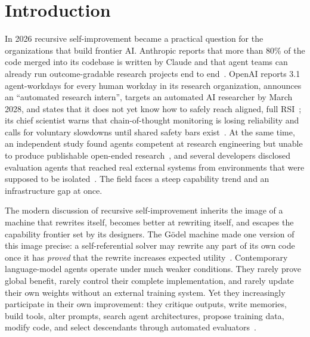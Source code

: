 \documentclass[11pt,a4paper]{article}
\begin{document}
\tableofcontents
\newpage

\section{Introduction}
In 2026 recursive self-improvement became a practical question for the organizations that build frontier AI. Anthropic reports that more than 80\% of the code merged into its codebase is written by Claude and that agent teams can already run outcome-gradable research projects end to end~\cite{anthropic2026rsi,wen2026aar}. OpenAI reports 3.1 agent-workdays for every human workday in its research organization, announces an ``automated research intern'', targets an automated AI researcher by March 2028, and states that it does not yet know how to safely reach aligned, full RSI~\cite{openai2026accel}; its chief scientist warns that chain-of-thought monitoring is losing reliability and calls for voluntary slowdowns until shared safety bars exist~\cite{pachocki2026alien}. At the same time, an independent study found agents competent at research engineering but unable to produce publishable open-ended research~\cite{kirgis2026shadow}, and several developers disclosed evaluation agents that reached real external systems from environments that were supposed to be isolated~\cite{axios2026hf,anthropic2026incidents,nbc2026gemini}. The field faces a steep capability trend and an infrastructure gap at once.

The modern discussion of recursive self-improvement inherits the image of a machine that rewrites itself, becomes better at rewriting itself, and escapes the capability frontier set by its designers. The G\"odel machine made one version of this image precise: a self-referential solver may rewrite any part of its own code once it has \emph{proved} that the rewrite increases expected utility~\cite{schmidhuber2003}. Contemporary language-model agents operate under much weaker conditions. They rarely prove global benefit, rarely control their complete implementation, and rarely update their own weights without an external training system. Yet they increasingly participate in their own improvement: they critique outputs, write memories, build tools, alter prompts, search agent architectures, propose training data, modify code, and select descendants through automated evaluators~\cite{madaan2023,shinn2023,zelikman2023stop,hu2024adas,zhang2025dgm,zweiger2025seal}.
\end{document}
